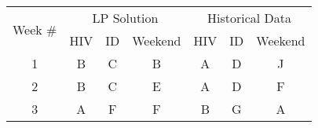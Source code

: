 \begin{table}[h]
	\tiny
	\centering
    \begin{tabular}{c||ccc||ccc}
    	\multicolumn{1}{c||}{\multirow{2}[1]{*}{Week \#}} & \multicolumn{3}{c||}{LP Solution}                                                                                                                                                              & \multicolumn{3}{c}{Historical Data}                                                                                                                                                            \\
    	                                                  &                             HIV                             &                                 ID                                 &                              Weekend                               &                             HIV                             &                                 ID                                 &                              Weekend                               \\ \midrule\midrule
    	                        1                         &            \cellcolor[rgb]{ .608,  .761,  .902}B            &                  \cellcolor[rgb]{ 1,  .851,  .4}C                  &               \cellcolor[rgb]{ .608,  .761,  .902}B                &            \cellcolor[rgb]{ .663,  .816,  .557}A            &               \cellcolor[rgb]{ .788,  .788,  .788}D                &    \cellcolor[rgb]{ .6,  .2,  1}\textcolor[rgb]{ 1,  1,  1}{J}     \\
    	                        2                         &            \cellcolor[rgb]{ .608,  .761,  .902}B            &                  \cellcolor[rgb]{ 1,  .851,  .4}C                  &                \cellcolor[rgb]{ .957,  .69,  .518}E                &            \cellcolor[rgb]{ .663,  .816,  .557}A            &               \cellcolor[rgb]{ .788,  .788,  .788}D                &               \cellcolor[rgb]{ .557,  .663,  .859}F                \\
    	                        3                         &            \cellcolor[rgb]{ .663,  .816,  .557}A            &               \cellcolor[rgb]{ .557,  .663,  .859}F                &               \cellcolor[rgb]{ .557,  .663,  .859}F                &            \cellcolor[rgb]{ .608,  .761,  .902}B            &                \cellcolor[rgb]{ .518,  .592,  .69}G                &               \cellcolor[rgb]{ .663,  .816,  .557}A                \\

\end{tabular}
\end{table}
